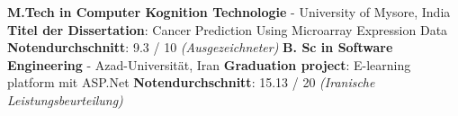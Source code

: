 %
%
%

\vspace{1em}

\begin{scholarship}

	{
		\textbf{M.Tech in Computer Kognition Technologie} - University of Mysore, India \newline
		\textbf{Titel der Dissertation}: Cancer Prediction Using Microarray Expression Data \newline
		\textbf{Notendurchschnitt}: 9.3 / 10 \textit{(Ausgezeichneter) }\newline
	}
	{
		\textbf{B. Sc in Software Engineering} - Azad-Universität, Iran \newline
		\textbf{Graduation project}: E-learning platform mit ASP.Net \newline
		\textbf{Notendurchschnitt}: 15.13 / 20 \textit{(Iranische Leistungsbeurteilung)}  \newline
	}
\end{scholarship}
